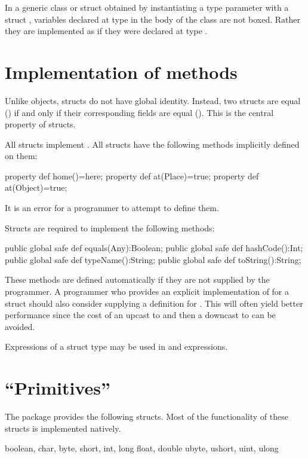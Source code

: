 In a generic class or struct obtained by instantiating a type parameter
 with a struct , variables declared at type  in the body
of the class are not boxed. Rather they are implemented as if they were declared at
type . 

\section{Implementation of  methods}
\label{StructAnyMethods}

Unlike objects, structs do not have global identity. Instead, two
structs are equal (\Xcd{==}) if and only if their corresponding fields
are equal (\Xcd{==}). This is the central property of structs.

All structs implement . All 
structs have the following methods implicitly defined on them:
\begin{xten}
  property def home()=here;
  property def at(Place)=true;
  property def at(Object)=true;
\end{xten}
\noindent It is an error for a programmer to attempt to define them.

Structs are required to implement the following methods: 
\begin{xten}
  public global safe def equals(Any):Boolean;
  public global safe def hashCode():Int;
  public global safe def typeName():String;
  public global safe def toString():String;  
\end{xten}

These methods are defined automatically if they are not supplied by
the programmer.  A programmer who provides an explicit implementation
of  for a struct  should also consider
supplying a definition for . This will often
yield better performance since the cost of an upcast to  and
then a downcast to  can be avoided.

Expressions of a struct type may be used in  and
 expressions.

\section{``Primitives''}

The package  provides the following structs. Most of
the functionality of these structs is implemented natively.

\begin{xten}
boolean, char, 
byte, short, int, long
float, double
ubyte, ushort, uint, ulong
\end{xten}
 
